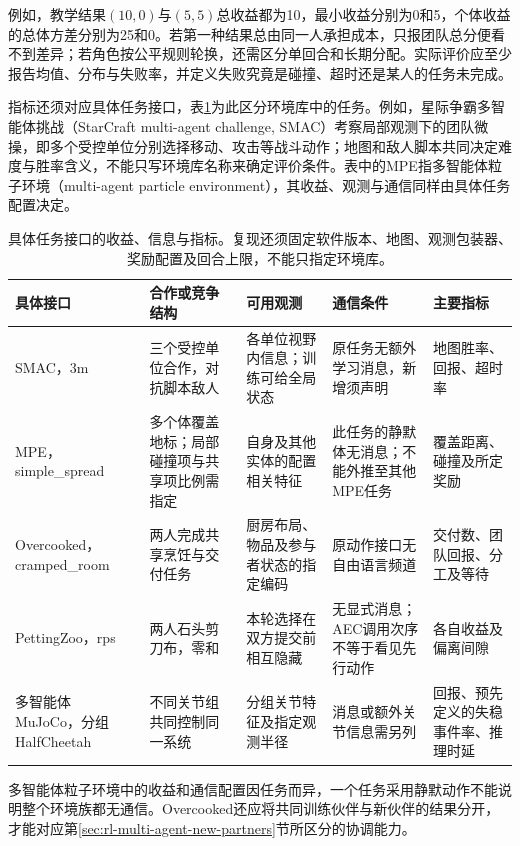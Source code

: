 例如，教学结果$(10,0)$与$(5,5)$总收益都为10，最小收益分别为0和5，个体收益的总体方差分别为25和0。若第一种结果总由同一人承担成本，只报团队总分便看不到差异；若角色按公平规则轮换，还需区分单回合和长期分配。实际评价应至少报告均值、分布与失败率，并定义失败究竟是碰撞、超时还是某人的任务未完成。

指标还须对应具体任务接口，表\ref{tab:rl-multi-agent-benchmarks}为此区分环境库中的任务。例如，星际争霸多智能体挑战（StarCraft multi-agent challenge, SMAC）考察局部观测下的团队微操，即多个受控单位分别选择移动、攻击等战斗动作；地图和敌人脚本共同决定难度与胜率含义，不能只写环境库名称来确定评价条件。表中的MPE指多智能体粒子环境（multi-agent particle environment），其收益、观测与通信同样由具体任务配置决定。

\begin{table}[t]
 \centering
 \begin{tabularx}{\linewidth}{@{}l >{\raggedright\arraybackslash}X >{\raggedright\arraybackslash}X >{\raggedright\arraybackslash}X >{\raggedright\arraybackslash}X@{}}
 \toprule
 具体接口 & 合作或竞争结构 & 可用观测 & 通信条件 & 主要指标\\
 \midrule
 SMAC，3m & 三个受控单位合作，对抗脚本敌人 & 各单位视野内信息；训练可给全局状态 & 原任务无额外学习消息，新增须声明 & 地图胜率、回报、超时率\\
 MPE，simple\_spread & 多个体覆盖地标；局部碰撞项与共享项比例需指定 & 自身及其他实体的配置相关特征 & 此任务的静默体无消息；不能外推至其他MPE任务 & 覆盖距离、碰撞及所定奖励\\
 Overcooked，cramped\_room & 两人完成共享烹饪与交付任务 & 厨房布局、物品及参与者状态的指定编码 & 原动作接口无自由语言频道 & 交付数、团队回报、分工及等待\\
 PettingZoo，rps & 两人石头剪刀布，零和 & 本轮选择在双方提交前相互隐藏 & 无显式消息；AEC调用次序不等于看见先行动作 & 各自收益及偏离间隙\\
 多智能体MuJoCo，分组HalfCheetah & 不同关节组共同控制同一系统 & 分组关节特征及指定观测半径 & 消息或额外关节信息需另列 & 回报、预先定义的失稳事件率、推理时延\\
 \bottomrule
 \end{tabularx}
 \caption{具体任务接口的收益、信息与指标。复现还须固定软件版本、地图、观测包装器、奖励配置及回合上限，不能只指定环境库。}
 \label{tab:rl-multi-agent-benchmarks}
\end{table}

多智能体粒子环境中的收益和通信配置因任务而异，一个任务采用静默动作不能说明整个环境族都无通信。Overcooked还应将共同训练伙伴与新伙伴的结果分开，才能对应第\ref{sec:rl-multi-agent-new-partners}节所区分的协调能力。

